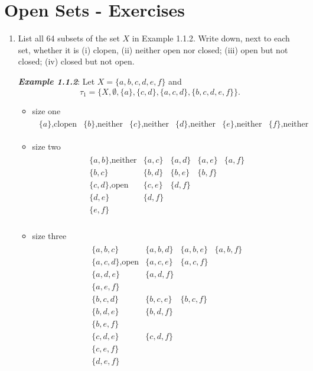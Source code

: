 \documentclass[10pt,a4paper]{report}
\begin{document}
\newpage
\section{Open Sets - Exercises}

\begin{enumerate}
\item List all 64 subsets of the set $X$ in Example 1.1.2.  Write down, next to each set, whether it is (i) clopen, (ii) neither open nor closed; (iii) open but not closed; (iv) closed but not open.

\newcommand{\OPEN}{\text{,open}}
\newcommand{\CLOSED}{\text{,closed}}
\newcommand{\CLOPEN}{\text{,clopen}}
\newcommand{\NOTT}{\text{,neither}}
\textbf{\textit{Example 1.1.2}}: Let $X=\{a,b,c,d,e,f\}$ and \[ \tau_1=\{X,\emptyset, \{a\}, \{c,d\},\{a,c,d\},\{b,c,d,e,f\}\}.\]
\begin{itemize}
	\item size one
	\begin{align*}
		\begin{array}{cccccc}
			\{a\}\CLOPEN&\{b\}\NOTT&\{c\}\NOTT&\{d\}\NOTT&\{e\}\NOTT&\{f\}\NOTT
		\end{array}
	\end{align*}
	
	\item size two
	\begin{align*}
		\begin{array}{ccccc}
			\{a,b\}\NOTT&\{a,c\}&\{a,d\}&\{a,e\}&\{a,f\}\\
			\{b,c\}&\{b,d\}&\{b,e\}&\{b,f\}\\
			\{c,d\}\OPEN&\{c,e\}&\{d,f\}\\
			\{d,e\}&\{d,f\}\\
			\{e,f\}\\
		\end{array}
	\end{align*}
	
	\item size three
	\begin{align*}
		\begin{array}{cccc}
			\{a,b,c\} & \{a,b,d\} & \{a,b,e\} & \{a,b,f\}\\
			\{a,c,d\}\OPEN & \{a,c,e\} & \{a,c,f\}\\
			\{a,d,e\} & \{a,d,f\}\\
			\{a,e,f\}\\
			\{b,c,d\} & \{b,c,e\} & \{b,c,f\}\\
			\{b,d,e\} & \{b,d,f\}\\
			\{b,e,f\}\\
			\{c,d,e\} & \{c,d,f\}\\
			\{c,e,f\}\\
			\{d,e,f\}
		\end{array}
	\end{align*}
	

\end{itemize}
\end{enumerate}
\end{document}
